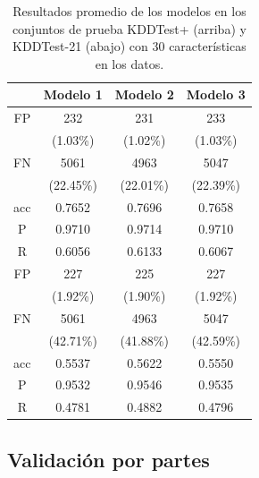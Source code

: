 \begin{table}[t]
    \begin{center}
        \label{tab:lessfeatures_results}
        \begin{tabular}{c|c|c|c} %
        \textbf{} & \textbf{Modelo 1} & \textbf{Modelo 2} & \textbf{Modelo 3}\\
        \hline
        FP & 232 & 231 & 233\\
        &(1.03\%)&(1.02\%)&(1.03\%)\\
        FN & 5061 & 4963 & 5047\\
        &(22.45\%)&(22.01\%)&(22.39\%)\\
        acc & 0.7652 & 0.7696 & 0.7658\\
        P & 0.9710 & 0.9714 & 0.9710\\
        R & 0.6056 & 0.6133 & 0.6067\\
        \hline
        FP & 227 & 225 & 227\\
        &(1.92\%)&(1.90\%)&(1.92\%)\\
        FN & 5061 & 4963 & 5047\\
        &(42.71\%)&(41.88\%)&(42.59\%)\\
        acc & 0.5537 & 0.5622 & 0.5550\\
        P & 0.9532 & 0.9546 & 0.9535\\
        R & 0.4781 & 0.4882 & 0.4796\\
        \end{tabular}

        \caption{Resultados promedio de los modelos en los conjuntos de prueba KDDTest+ (arriba) y KDDTest-21 (abajo) con 30 características en los datos.}
    \end{center}
\end{table}

\subsection{Validación por partes}


